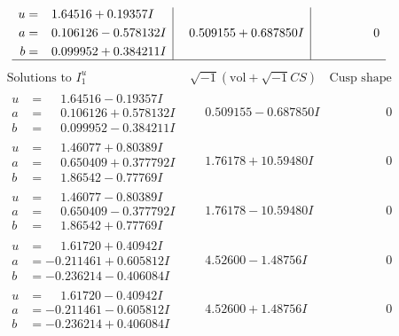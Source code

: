 \documentclass[1p]{elsarticle_modified}
\theoremstyle{definition}
\newcommand{\I}{\sqrt{-1}}
\begin{document}
$$\begin{array}{c|c|c}
\begin{aligned}
u &= \phantom{-}1.64516 + 0.19357 I \\
a &= \phantom{-}0.106126 - 0.578132 I \\
b &= \phantom{-}0.099952 + 0.384211 I\end{aligned}
 & \phantom{-}0.509155 + 0.687850 I & \phantom{-0.000000 } 0\\
 \hline 
 \end{array}$$\newpage$$\begin{array}{c|c|c}  
\text{Solutions to }I^u_{1}& \I (\text{vol} + \sqrt{-1}CS) & \text{Cusp shape}\\
 \hline 
\begin{aligned}
u &= \phantom{-}1.64516 - 0.19357 I \\
a &= \phantom{-}0.106126 + 0.578132 I \\
b &= \phantom{-}0.099952 - 0.384211 I\end{aligned}
 & \phantom{-}0.509155 - 0.687850 I & \phantom{-0.000000 } 0 \\ \hline\begin{aligned}
u &= \phantom{-}1.46077 + 0.80389 I \\
a &= \phantom{-}0.650409 + 0.377792 I \\
b &= \phantom{-}1.86542 - 0.77769 I\end{aligned}
 & \phantom{-}1.76178 + 10.59480 I & \phantom{-0.000000 } 0 \\ \hline\begin{aligned}
u &= \phantom{-}1.46077 - 0.80389 I \\
a &= \phantom{-}0.650409 - 0.377792 I \\
b &= \phantom{-}1.86542 + 0.77769 I\end{aligned}
 & \phantom{-}1.76178 - 10.59480 I & \phantom{-0.000000 } 0 \\ \hline\begin{aligned}
u &= \phantom{-}1.61720 + 0.40942 I \\
a &= -0.211461 + 0.605812 I \\
b &= -0.236214 - 0.406084 I\end{aligned}
 & \phantom{-}4.52600 - 1.48756 I & \phantom{-0.000000 } 0 \\ \hline\begin{aligned}
u &= \phantom{-}1.61720 - 0.40942 I \\
a &= -0.211461 - 0.605812 I \\
b &= -0.236214 + 0.406084 I\end{aligned}
 & \phantom{-}4.52600 + 1.48756 I & \phantom{-0.000000 } 0 \\ \hline\begin{aligned}

\end{aligned}
\end{array}$$
\end{document}
